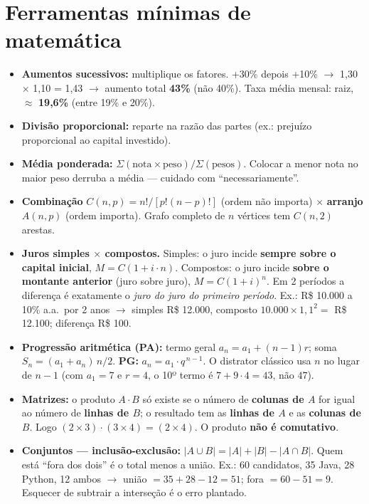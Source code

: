 \section{Ferramentas mínimas de matemática}

\begin{itemize}
\item \textbf{Aumentos sucessivos:} multiplique os fatores. +30\% depois
+10\% $\to$ 1,30 $\times$ 1,10 = 1,43 $\to$ aumento total \textbf{43\%} (não
40\%). Taxa média mensal: raiz, $\approx$ \textbf{19,6\%} (entre 19\% e
20\%).
\item \textbf{Divisão proporcional:} reparte na razão das partes (ex.:
prejuízo proporcional ao capital investido).
\item \textbf{Média ponderada:} $\Sigma(\text{nota} \times \text{peso}) /
\Sigma(\text{pesos})$. Colocar a menor nota no maior peso derruba a média ---
cuidado com ``necessariamente''.
\item \textbf{Combinação} $C(n,p) = n!/[p!(n-p)!]$ (ordem não importa)
$\times$ \textbf{arranjo} $A(n,p)$ (ordem importa). Grafo completo de $n$
vértices tem $C(n,2)$ arestas.
\item \textbf{Juros simples $\times$ compostos.} Simples: o juro incide
\textbf{sempre sobre o capital inicial}, $M = C(1 + i \cdot n)$. Compostos: o
juro incide \textbf{sobre o montante anterior} (juro sobre juro), $M = C(1 +
i)^n$. Em 2 períodos a diferença é exatamente o \emph{juro do juro do
primeiro período}. Ex.: R\$ 10.000 a 10\% a.a.\ por 2 anos $\to$ simples R\$
12.000, composto $10.000 \times 1{,}1^2 = $ R\$ 12.100; diferença R\$ 100.
\item \textbf{Progressão aritmética (PA):} termo geral $a_n = a_1 + (n-1)r$;
soma $S_n = (a_1 + a_n)\,n/2$. \textbf{PG:} $a_n = a_1 \cdot q^{\,n-1}$. O
distrator clássico usa $n$ no lugar de $n-1$ (com $a_1=7$ e $r=4$, o 10º
termo é $7 + 9{\cdot}4 = 43$, não $47$).
\item \textbf{Matrizes:} o produto $A \cdot B$ só existe se o número de
\textbf{colunas de $A$} for igual ao número de \textbf{linhas de $B$}; o
resultado tem as \textbf{linhas de $A$} e as \textbf{colunas de $B$}. Logo
$(2{\times}3) \cdot (3{\times}4) = (2{\times}4)$. O produto \textbf{não é
comutativo}.
\item \textbf{Conjuntos --- inclusão-exclusão:} $|A \cup B| = |A| + |B| - |A
\cap B|$. Quem está ``fora dos dois'' é o total menos a união. Ex.: 60
candidatos, 35 Java, 28 Python, 12 ambos $\to$ união $= 35+28-12 = 51$; fora
$= 60-51 = 9$. Esquecer de subtrair a interseção é o erro plantado.

\end{itemize}
